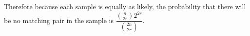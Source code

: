 \documentclass[10pt,twoside]{article}
\begin{document}
\begin{enumerate}
{    Therefore because each sample is equally as likely, the probability that there will be no matching pair in the sample is $\dfrac{\binom{n}{2r}2^{2r}}{\binom{2n}{2r}}$.}
    

\end{enumerate}
\end{document}
